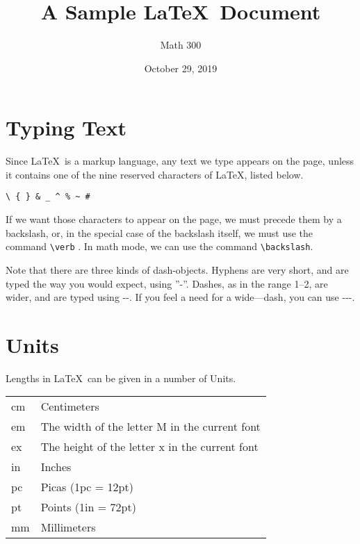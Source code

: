 \documentclass[a4paper,12pt]{extarticle}
\begin{document}
\title{A Sample \LaTeX\ Document}
\author{Math 300}
\date{October 29, 2019}

\maketitle

\section{Typing Text}
Since \LaTeX\ is a markup language, any text we type appears on the page,
unless it contains one of the nine reserved characters of \LaTeX, listed below.
\begin{flushleft}
\verb|\ { } & _ ^ % ~ # | 
\end{flushleft}
If we want those characters to appear on the page, we must precede them by
a backslash, or, in the special case of the backslash itself, we must use the
command \verb|\verb| . In math mode, we can use the command \verb|\backslash|.
\par
Note that there are three kinds of dash-objects. Hyphens are very short,
and are typed the way you would expect, using ''-''. Dashes, as in the range 1--2, are wider, and are typed using -{}-. If you feel a need for a wide---dash,
you can use -{}-{}-.

\section{Units}
Lengths in \LaTeX\ can be given in a number of Units. \\
    \begin{tabular}{l l}
    cm & Centimeters \\
    em & The width of the letter M in the current font \\
    ex & The height of the letter x in the current font \\
    in & Inches \\
    pc & Picas (1pc = 12pt) \\
    pt & Points (1in = 72pt) \\
    mm & Millimeters
    \end{tabular}
\newpage
\end{document}
